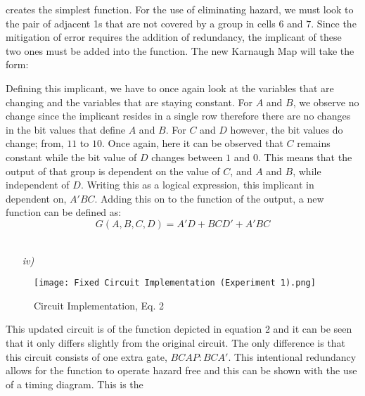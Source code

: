 \documentclass[12pt]{article}
\begin{document}
    creates the simplest function. For the use of eliminating hazard, we must
    look to the pair of adjacent 1s that are not covered by a group in cells $6$
    and $7$. Since the mitigation of error requires the addition of redundancy,
    the implicant of these two ones must be added into the function. The new
    Karnaugh Map will take the form:
    \begin{center}
    \end{center}
    \par Defining this implicant, we have to once again look at the variables
    that are changing and the variables that are staying constant. For $A$ and
    $B$, we observe no change since the implicant resides in a single row
    therefore there are no changes in the bit values that define $A$ and $B$.
    For $C$ and $D$ however, the bit values do change; from, $11$ to $10$.  Once
    again, here it can be observed that $C$ remains constant while the bit value
    of $D$ changes between $1$ and $0$. This means that the output of that group
    is dependent on the value of $C$, and $A$ and $B$, while independent of $D$.
    Writing this as a logical expression, this implicant in dependent on,
    $A'BC$. Adding this on to the function of the output, a new function can be
    defined as:
    \begin{equation}
        G\left(A,B,C,D \right) = A'D + BCD' + A'BC
    \end{equation}
    \\
    \begin{itemize}
        \item[\textit{iv)}]
    \end{itemize}
    \begin{figure}[h]
        \centering
        \texttt{[image: Fixed Circuit Implementation
        (Experiment 1).png]}
        \caption{Circuit Implementation, Eq. 2}%
        \label{fig:2}
    \end{figure}
    \par This updated circuit is of the function depicted in equation 2 and it
    can be seen that it only differs slightly from the original circuit. The
    only difference is that this circuit consists of one extra gate, $BCAP:
    BCA'$. This intentional redundancy allows for the function to operate hazard
    free and this can be shown with the use of a timing diagram. This is the
\end{document}

